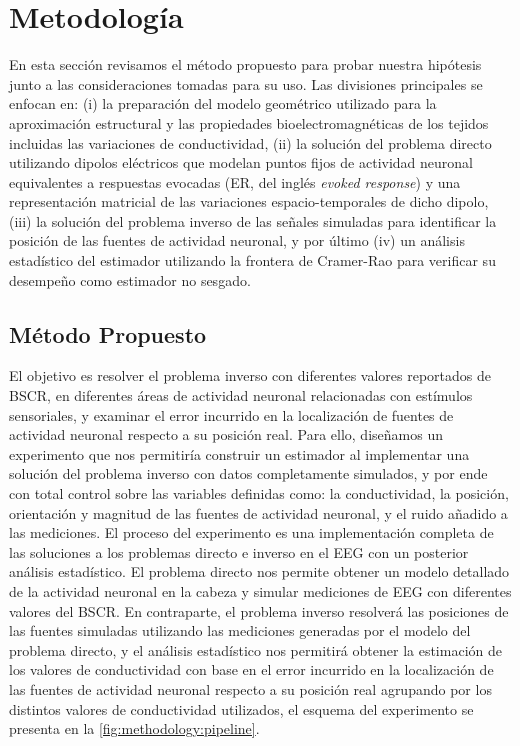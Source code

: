 %
\chapter{Metodología}
\label{sec:methodology}

En esta sección revisamos el método propuesto para probar nuestra hipótesis junto a las consideraciones tomadas para su uso.
Las divisiones principales se enfocan en:\linebreak
(i) la preparación del modelo geométrico utilizado para la aproximación estructural y las propiedades bioelectromagnéticas de los tejidos incluidas las variaciones de conductividad, (ii) la solución del problema directo utilizando dipolos eléctricos que modelan puntos fijos de actividad neuronal equivalentes a respuestas evocadas (ER, del inglés \emph{evoked response}) y una representación matricial de las variaciones espacio-temporales de dicho dipolo, (iii) la solución del problema inverso de las señales simuladas para identificar la posición de las fuentes de actividad neuronal, y por último (iv) un análisis estadístico del estimador utilizando la frontera de Cramer-Rao para verificar su desempeño como estimador no sesgado.

\section{Método Propuesto}
\label{sec:methodology:method}

El objetivo es resolver el problema inverso con diferentes valores reportados de BSCR, en diferentes áreas de actividad neuronal relacionadas con estímulos sensoriales, y examinar el error incurrido en la localización de fuentes de actividad neuronal respecto a su posición real. 
Para ello, diseñamos un experimento que nos permitiría construir un estimador al implementar una solución del problema inverso con datos completamente simulados, y por ende con total control sobre las variables definidas como: la conductividad, la posición, orientación y magnitud de las fuentes de actividad neuronal, y el ruido añadido a las mediciones.
El proceso del experimento es una implementación completa de las soluciones a los problemas directo e inverso en el EEG con un posterior análisis estadístico. 
El problema directo nos permite obtener un modelo detallado de la actividad neuronal en la cabeza y simular mediciones de EEG con diferentes valores del BSCR.
En contraparte, el problema inverso resolverá las posiciones de las fuentes simuladas utilizando las mediciones generadas por el modelo del problema directo, y el análisis estadístico nos permitirá obtener la estimación de los valores de conductividad con base en el error incurrido en la localización de las fuentes de actividad neuronal respecto a su posición real agrupando por los distintos valores de conductividad utilizados, el esquema del experimento se presenta en la \cref{fig:methodology:pipeline}.

